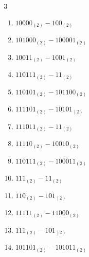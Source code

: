 \begin{multicols}{3}
\begin{enumerate}
  \item $10000_{(2)} - 100_{(2)}$


  \item $101000_{(2)} - 100001_{(2)}$


  \item $10011_{(2)} - 1001_{(2)}$


  \item $110111_{(2)} - 11_{(2)}$


  \item $110101_{(2)} - 101100_{(2)}$


  \item $111101_{(2)} - 10101_{(2)}$


  \item $111011_{(2)} - 11_{(2)}$


  \item $11110_{(2)} - 10010_{(2)}$


\columnbreak %

\resetques

  \item $110111_{(2)} - 100011_{(2)}$


  \item $111_{(2)} - 11_{(2)}$


  \item $110_{(2)} - 101_{(2)}$


  \item $11111_{(2)} - 11000_{(2)}$


  \item $111_{(2)} - 101_{(2)}$


  \item $101101_{(2)} - 101011_{(2)}$


\end{enumerate}
\end{multicols}
